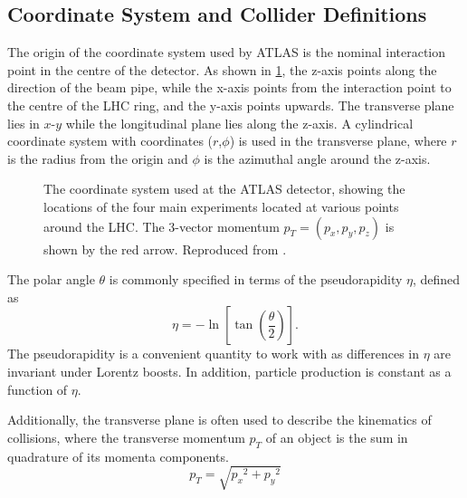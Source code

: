 \subsection{Coordinate System and Collider Definitions}
\label{coordinate-system}


The origin of the coordinate system used by ATLAS is the nominal interaction point in the centre of the detector. As shown in \ref{fig:atlas-coord-system}, the z-axis points along the direction of the beam pipe, while the x-axis points from the interaction point to the centre of the LHC ring, and the y-axis points upwards.
The transverse plane lies in $x$-$y$ while the longitudinal plane lies along the z-axis. A cylindrical coordinate system with coordinates ($r$,$\phi$) is used in the transverse plane, where $r$ is the radius from the origin and $\phi$ is the azimuthal angle around the z-axis.

\begin{figure}[!htbp]
  \centering
  
  \caption{
    The coordinate system used at the ATLAS detector, showing the locations of the four main experiments located at various points around the LHC. The 3-vector momentum $p_{T} = (p_x, p_y, p_z)$ is shown by the red arrow. Reproduced from \cite{Strong:2020mge}.
  }
  \label{fig:atlas-coord-system}
\end{figure}


The polar angle $\theta$ is commonly specified in terms of the pseudorapidity $\eta$, defined as
%
\begin{equation}\label{eq:pseudorap}
  \eta = - \ln \left[ \tan \left( \frac{\theta}{2} \right) \right] .
\end{equation}
%
The pseudorapidity is a convenient quantity to work with as differences in $\eta$ are invariant under Lorentz boosts. In addition, particle production is constant as a function of $\eta$.

Additionally, the transverse plane is often used to describe the kinematics of collisions, where the transverse momentum $p_{T}$ of an object is the sum in quadrature of its momenta components.
%
\begin{equation}\label{eq:pt}
  p_T = \sqrt{ {p_x}^2 + {p_y}^2 }
\end{equation}



